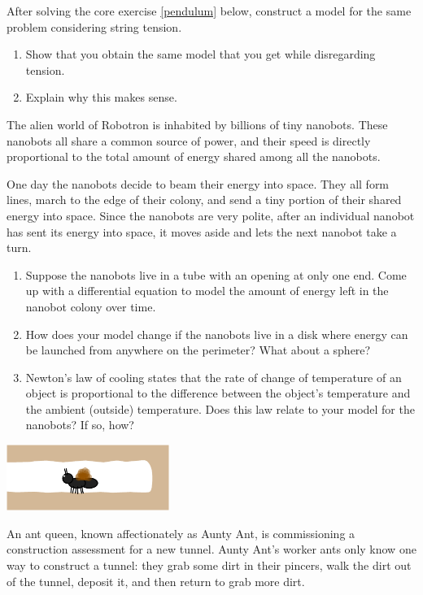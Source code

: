 \begin{exercises}
\begin{problist}
	\prob After solving the core exercise \ref{pendulum} below, construct a model for the same problem considering string tension.
	\begin{enumerate}
		\item Show that you obtain the same model that you get while disregarding tension.
		\item Explain why this makes sense.
	\end{enumerate}
	
	\prob 	The alien world of Robotron is inhabited by billions of tiny nanobots.  These nanobots
	all share a common source of power, and their speed is directly proportional to the
	total amount of energy shared among all the nanobots. 

	One day the nanobots decide to beam their energy into space.  They all form lines,
	march to the edge of their colony, and send a tiny portion of their shared energy into
	space.  Since the nanobots are very polite, after an individual nanobot has sent its energy
	into space, it moves aside and lets the next nanobot take a turn.

	\begin{enumerate}
		\item Suppose the nanobots live in a tube with an opening at only one end.  Come
			up with a differential equation to model the amount of energy left in the nanobot
			colony over time.
		\item How does your model change if the nanobots live in a disk where energy can be launched
			from anywhere on the perimeter?  What about a sphere?
		\item Newton's law of cooling states that the rate of change of temperature of an object is
			proportional to the difference between the object's temperature and the ambient (outside)
			temperature.  Does this law relate to your model for the nanobots?  If so, how?
	\end{enumerate}


	\begin{center}
		\includegraphics*[width=150pt]{images/module11-ant_tunnel.pdf}
	\end{center}
	
	\prob 	An ant queen, known affectionately as Aunty Ant, is commissioning a construction assessment
	for a new tunnel.  Aunty Ant's worker ants only know one way to construct a tunnel: they grab some dirt in their pincers,
	walk the dirt out of the tunnel, deposit it, and then return to grab more dirt.
	

\end{problist}
\end{exercises}
